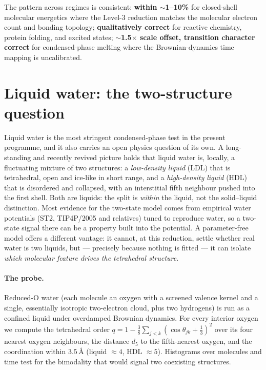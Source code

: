 \documentclass[11pt]{article}
\begin{document}
The pattern across regimes is consistent: \textbf{within $\sim$1--10\%} for closed-shell molecular energetics where the Level-3 reduction matches the molecular electron count and bonding topology; \textbf{qualitatively correct} for reactive chemistry, protein folding, and excited states; \textbf{$\sim$1.5$\times$ scale offset, transition character correct} for condensed-phase melting where the Brownian-dynamics time mapping is uncalibrated.

\section{Liquid water: the two-structure question}\label{sec:water}

Liquid water is the most stringent condensed-phase test in the present programme, and it also
carries an open physics question of its own. A long-standing and recently revived picture holds
that liquid water is, locally, a fluctuating mixture of two structures: a \emph{low-density liquid}
(LDL) that is tetrahedral, open and ice-like in short range, and a \emph{high-density liquid} (HDL)
that is disordered and collapsed, with an interstitial fifth neighbour pushed into the first shell.
Both are liquids: the split is \emph{within} the liquid, not the solid--liquid distinction. Most
evidence for the two-state model comes from empirical water potentials (ST2, TIP4P/2005 and
relatives) tuned to reproduce water, so a two-state signal there can be a property built into the
potential. A parameter-free model offers a different vantage: it cannot, at this reduction, settle
whether real water is two liquids, but --- precisely because nothing is fitted --- it can isolate
\emph{which molecular feature drives the tetrahedral structure}.

\paragraph{The probe.} Reduced-O water (each molecule an oxygen with a screened valence kernel and a
single, essentially isotropic two-electron cloud, plus two hydrogens) is run as a confined liquid
under overdamped Brownian dynamics. For every interior oxygen we compute the tetrahedral order
$q = 1 - \tfrac{3}{8}\sum_{j<k}(\cos\theta_{jk}+\tfrac13)^2$ over its four nearest oxygen neighbours,
the distance $d_5$ to the fifth-nearest oxygen, and the coordination within $3.5$\,\AA{} (liquid
$\approx 4$, HDL $\approx 5$). Histograms over molecules and time test for the bimodality that would
signal two coexisting structures.
\end{document}
